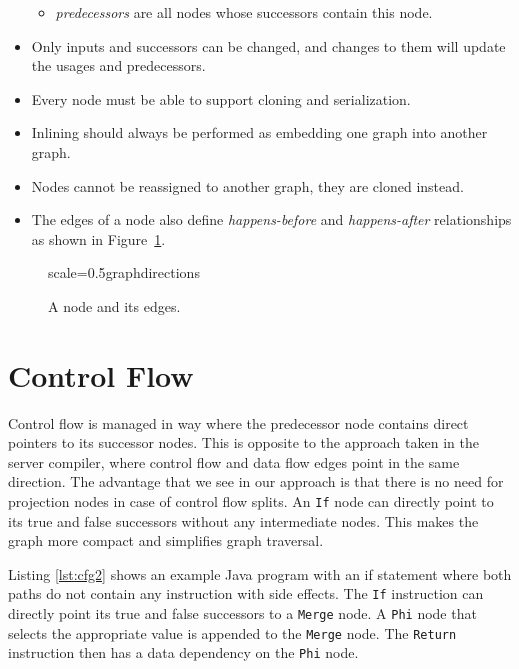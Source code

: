 \documentclass[twocolumn]{svjour3}
\begin{document}
\begin{itemize}
\begin{itemize}
        \item \emph{predecessors} are all nodes whose successors contain this node.
    \end{itemize}
    \item Only inputs and successors can be changed, and changes to them will update the usages and predecessors.
    \item Every node must be able to support cloning and serialization.
    \item Inlining should always be performed as embedding one graph into another graph.
    \item Nodes cannot be reassigned to another graph, they are cloned instead.
    \item The edges of a node also define \textit{happens-before} and \textit{happens-after} relationships as shown in Figure~\ref{fig:directions}.
\end{itemize}

\begin{figure}[h]
  \centering
\begin{digraphenv}{scale=0.5}{graphdirections}
\end{digraphenv}
  \caption{A node and its edges.}
  \label{fig:directions}
\end{figure}

\section{Control Flow}

Control flow is managed in way where the predecessor node contains direct pointers to its successor nodes.
This is opposite to the approach taken in the server compiler, where control flow and data flow edges point in the same direction.
The advantage that we see in our approach is that there is no need for projection nodes in case of control flow splits.
An \texttt{If} node can directly point to its true and false successors without any intermediate nodes.
This makes the graph more compact and simplifies graph traversal.

Listing \ref{lst:cfg2} shows an example Java program with an if statement where both paths do not contain any instruction with side effects.
The \texttt{If} instruction can directly point its true and false successors to a \texttt{Merge} node.
A \texttt{Phi} node that selects the appropriate value is appended to the \texttt{Merge} node.
The \texttt{Return} instruction then has a data dependency on the \texttt{Phi} node.
\end{document}
